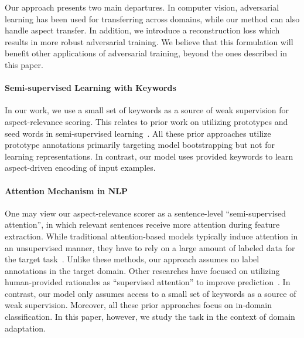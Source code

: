 Our approach presents two main departures. In computer vision, adversarial learning has been used for transferring across domains, while our method can also handle aspect transfer.  In addition, we introduce a
reconstruction loss which results in more robust adversarial training. We believe that this formulation will benefit other applications of adversarial training, beyond the ones described in this paper.

\paragraph{Semi-supervised Learning with Keywords} In our work, we use a small set of keywords as a source of weak supervision for aspect-relevance scoring. This relates to prior work on utilizing prototypes and seed words in semi-supervised learning~\cite{haghighi2006prototype,grenager2005unsupervised,chang2007guiding,mann2008generalized,jagarlamudi2012incorporating,li2012wiki,eisenstein2017unsupervised}. 
All these prior approaches utilize prototype annotations primarily targeting model bootstrapping but not for learning representations. In contrast, our model uses provided keywords to learn aspect-driven encoding of input examples. 




\paragraph{Attention Mechanism in NLP} One may view our aspect-relevance scorer as a sentence-level ``semi-supervised attention'', in which relevant sentences receive more attention during feature extraction. While traditional attention-based models typically induce attention in an unsupervised manner, they have to rely on a large amount of labeled data for the target task~\cite{bahdanau2014neural,rush2015neural,chen2015abc,cheng2016long,xu2015show,xu2015ask,yang2015stacked,martins2016softmax,lei2016rationalizing}. Unlike these methods, our approach assumes no label annotations in the target domain. Other researches have focused on utilizing human-provided rationales as ``supervised attention'' to improve prediction~\cite{zaidan2007using,marshall2015robotreviewer,zhang2016rationale,brun-perez-roux:2016:SemEval}. In contrast, our model only assumes access to a small set of keywords as a source of weak supervision. Moreover, all these prior approaches focus on in-domain classification. In this paper, however, we study the task in the context of domain adaptation. 

